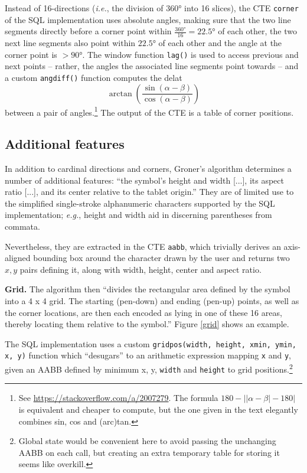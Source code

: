 \documentclass[sigconf]{acmart}
\begin{document}
Instead of 16-directions (\textit{i.e.}, the division of 360° into 16 slices), the CTE \texttt{corner} of the SQL implementation uses absolute angles, making sure that the two line segments directly before a corner point within $\frac{360°}{16} = 22.5°$ of each other, the two next line segments also point within $22.5°$ of each other and the angle at the corner point is $>90°$. The window function \texttt{lag()} is used to access previous and next points – rather, the angles the associated line segments point towards – and a custom \texttt{angdiff()} function computes the delat $$\arctan\left(\frac{\sin(\alpha-\beta)}{\cos(\alpha-\beta)}\right)$$ between a pair of angles.\footnote{See \url{https://stackoverflow.com/a/2007279}. The formula $180 - \left|\left|\alpha - \beta\right| - 180\right|$ is equivalent and cheaper to compute, but the one given in the text elegantly combines sin, cos and (arc)tan.} The output of the CTE is a table of corner positions.

\subsection{Additional features}

In addition to cardinal directions and corners, Groner's algorithm determines a number of additional features: \enquote{the symbol's height and width [...], its aspect ratio [...], and its center relative to the tablet origin.} \cite{groner} They are of limited use to the simplified single-stroke alphanumeric characters supported by the SQL implementation; \textit{e.g.}, height and width aid in discerning parentheses from commata.

Nevertheless, they are extracted in the CTE \texttt{aabb}, which trivially derives an axis-aligned bounding box around the character drawn by the user and returns two $x,y$ pairs defining it, along with width, height, center and aspect ratio.

\textbf{Grid.} The algorithm then \enquote{divides the rectangular area defined by the symbol into a 4 x 4 grid. The starting (pen-down) and ending (pen-up) points, as well as the corner locations, are then each encoded as lying in one of these 16 areas, thereby locating them relative to the symbol.} \cite{groner} Figure \ref{grid} shows an example.

The SQL implementation uses a custom \texttt{gridpos(width, height, xmin, ymin, x, y)} function which \enquote{desugars} to an arithmetic expression mapping \texttt{x} and \texttt{y}, given an AABB defined by minimum x, y, \texttt{width} and \texttt{height} to grid positions.\footnote{Global state would be convenient here to avoid passing the unchanging AABB on each call, but creating an extra temporary table for storing it seems like overkill.}
\end{document}
